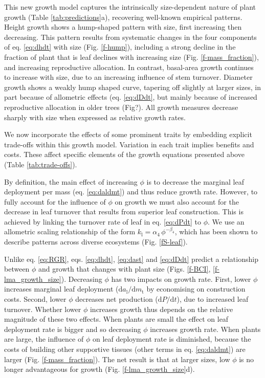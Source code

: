 \documentclass[12pt, a4paper]{article}
\begin{document}
This new growth model captures the intrinsically size-dependent nature
of plant growth (Table \ref{tab:predictions}a), recovering well-known
empirical patterns\citep{sillett_increasing_2010, king_size-related_2011}. Height growth shows a hump-shaped pattern
with size, first increasing then decreasing. This pattern results from
systematic changes in the four components of eq. \ref{eq:dhdt} with size
(Fig. \ref{f-hump}), including a strong decline in the fraction of plant
that is leaf declines with increasing size (Fig. \ref{f-mass_fraction}),
and increasing reproductive allocation. In contrast, basal-area growth
continues to increase with size\citep{sillett_increasing_2010,
@stephenson_rate_2014}, due to an increasing influence of stem
turnover. Diameter growth shows a weakly hump shaped
curve\citep{herault_functional_2011}, tapering off slightly at larger
sizes, in part because of allometric effects (eq. \ref{eq:dDdt}, but
mainly because of increased reproductive allocation in older trees
(Fig?). All growth measures decrease sharply with size when expressed as
relative growth rates\citep{iida_linking_2014}.

We now incorporate the effects of some prominent traits by embedding
explicit trade-offs within this growth model. Variation in each trait
implies benefits and costs. These affect specific elements of the growth
equations presented above (Table \ref{tab:trade-offs}).

By definition, the main effect of increasing \(\phi\) is to decrease the
marginal leaf deployment per mass (eq. \ref{eq:daldmt}) and thus reduce
growth rate. However, to fully account for the influence of \(\phi\) on
growth we must also account for the decrease in leaf turnover that
results from superior leaf construction\citep{wright_world-wide_2004}.
This is achieved by linking the turnover rate of leaf in eq.
\ref{eq:dPdt} to \(\phi\). We use an allometric scaling relationship of
the form \(k_\textrm{l}=\alpha_4 \, \phi^{-\beta_4}\), which has been
shown to describe patterns across diverse
ecosystems\citep{wright_world-wide_2004} (Fig. \ref{fS-leaf}).

Unlike eq. \ref{eq:RGR}, eqs. \ref{eq:dhdt}, \ref{eq:dast} and
\ref{eq:dDdt} predict a relationship between \(\phi\) and growth that
changes with plant size (Figs. \ref{f-BCI}, \ref{f-lma_growth_size}).
Decreasing \(\phi\) has two impacts on growth rate. First, lower
\(\phi\) increases marginal leaf deployment
(\(\textrm{d}a_\textrm{l} / \textrm{d}m_\textrm{t}\) by economising on
construction costs. Second, lower \(\phi\) decreases net production
(\(\textrm{d}P / \textrm{d}t\)), due to increased leaf turnover. Whether
lower \(\phi\) increases growth thus depends on the relative magnitude
of these two effects. When plants are small the effect on leaf
deployment rate is bigger and so decreasing \(\phi\) increases growth
rate. When plants are large, the influence of \(\phi\) on leaf
deployment rate is diminished, because the costs of building other
supportive tissues (other terms in eq. \ref{eq:daldmt}) are larger (Fig.
\ref{f-mass_fraction}). The net result is that at larger sizes, low
\(\phi\) is no longer advantageous for growth (Fig.
\ref{f-lma_growth_size}d).
\end{document}
